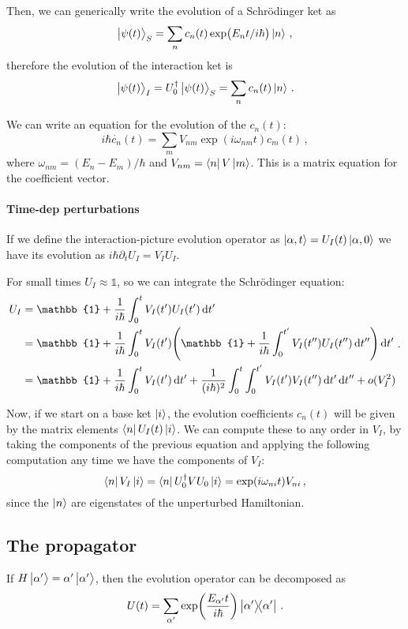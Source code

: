\documentclass[main.tex]{subfiles}
\begin{document}
Then, we can generically write the evolution of a Schrödinger ket as 
%
\begin{equation}
  \ket{\psi (t)}_S = 
  \sum _{n}  c_n(t) \exp(E_n t / i \hbar) \ket{n}
\,,
\end{equation}
%
therefore the evolution of the interaction ket is 
%
\begin{equation}
    \ket{\psi (t)}_I = 
    U_0 ^\dag \ket{\psi (t)} _S = \sum _n c_n (t) \ket{n} 
\,.
\end{equation}

We can write an equation for the evolution of the \(c_n(t)\): 
%
\begin{equation}
  i \hbar \dot{c_n} (t) = \sum_m V_{nm} \exp(i \omega_{nm} t) c_m(t) 
\,,
\end{equation}
%
where \(\omega_{nm} = (E_n - E_m) / \hbar\) and \(V_{nm} = \bra{n} V \ket{m} \). This is a matrix equation for the coefficient vector. 

\paragraph{Time-dep perturbations}

If we define the interaction-picture evolution operator as \(\ket{\alpha, t}  = U_I (t) \ket{\alpha, 0} \) we have its evolution as \(i \hbar \partial_t U_I = V_I U_I\).

For small times \(U_I \approx \mathbb{1}\), so we can integrate the Schrödinger equation: 
%
\begin{subequations}
    \begin{align}
        U_I &= \mathbb{1} + \frac{1}{i \hbar} \int_0^t V_I(t') U_I(t') \dd{t'}  \\
        &= \mathbb{1} + \frac{1}{i \hbar}\int_0^t V_I(t')\qty(
            \mathbb{1} + \frac{1}{i \hbar} \int_0^{t'} V_I(t'') U_I(t'') \dd{t''}
        ) \dd{t'}  \\
        &= \mathbb{1} + \frac{1}{i \hbar}\int_0^t V_I(t') \dd{t'} + \frac{1}{(i \hbar)^2} \int_0^t \int_0^{t'}V_I(t')V_I(t'') \dd{t'} \dd{t''} + o(V_I^2)
\end{align}
\,.
\end{subequations}
%

Now, if we start on a base ket \(\ket{i} \), the evolution coefficients \(c_n(t)\) will be given by the matrix elements \(\bra{n} U_I (t) \ket{i} \).
We can compute these to any order in \(V_I\), by taking the components of the previous equation and applying the following computation any time we have the components of \(V_I\): 
%
\begin{equation}
  \bra{n} V_I \ket{i} = \bra{n} U_0 ^\dag V U_0 \ket{i} = \exp(i \omega_{ni} t) V_{ni} 
\,,
\end{equation}
%
since the \(\ket{n} \) are eigenstates of the unperturbed Hamiltonian. 

\subsection{The propagator}

If \(H \ket{\alpha '} = \alpha ' \ket{\alpha '} \), then the evolution operator can be decomposed as 
%
\begin{equation}
  U (t) = \sum _{\alpha '} \exp(\frac{E_{\alpha '} t}{i \hbar}) \dyad{\alpha '}  
\,.
\end{equation}
%
\end{document}
